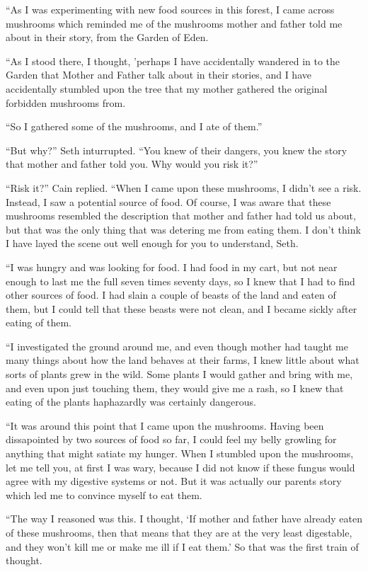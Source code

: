 \documentclass[12pt,twoside,titlepage]{report}
\begin{document}
``As I was experimenting with new food sources in this forest, I came
across mushrooms which reminded me of the mushrooms mother and father
told me about in their story, from the Garden of Eden.

``As I stood there, I thought, 'perhaps I have accidentally wandered in
to the Garden that Mother and Father talk about in their stories, and I
have accidentally stumbled upon the tree that my mother gathered the
original forbidden mushrooms from.

``So I gathered some of the mushrooms, and I ate of them.''

``But why?'' Seth inturrupted. ``You knew of their dangers, you knew the
story that mother and father told you. Why would you risk it?''

``Risk it?'' Cain replied. ``When I came upon these mushrooms, I didn't
see a risk. Instead, I saw a potential source of food. Of course, I was
aware that these mushrooms resembled the description that mother and
father had told us about, but that was the only thing that was detering
me from eating them. I don't think I have layed the scene out well
enough for you to understand, Seth.

``I was hungry and was looking for food. I had food in my cart, but not
near enough to last me the full seven times seventy days, so I knew that
I had to find other sources of food. I had slain a couple of beasts of
the land and eaten of them, but I could tell that these beasts were not
clean, and I became sickly after eating of them.

``I investigated the ground around me, and even though mother had taught
me many things about how the land behaves at their farms, I knew little
about what sorts of plants grew in the wild. Some plants I would gather
and bring with me, and even upon just touching them, they would give me
a rash, so I knew that eating of the plants haphazardly was certainly
dangerous.

``It was around this point that I came upon the mushrooms. Having been
dissapointed by two sources of food so far, I could feel my belly
growling for anything that might satiate my hunger. When I stumbled upon
the mushrooms, let me tell you, at first I was wary, because I did not
know if these fungus would agree with my digestive systems or not. But
it was actually our parents story which led me to convince myself to eat
them.

``The way I reasoned was this. I thought, `If mother and father have
already eaten of these mushrooms, then that means that they are at the
very least digestable, and they won't kill me or make me ill if I eat
them.' So that was the first train of thought.
\end{document}
